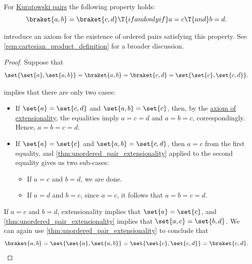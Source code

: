 \begin{proposition}\label{thm:kuratowski_pair_extensionality}
  For \hyperref[def:kuratowski_pair]{Kuratowski pairs} the following property holds:
  \begin{equation*}
    \braket{ a, b } = \braket{ c, d } \T{if and only if} a = c \T{and} b = d.
  \end{equation*}
\end{proposition}
\begin{comments}
  \item \Textcite[72]{Bourbaki2004TheoryOfSets} introduce an axiom for the existence of ordered pairs satisfying this property. See \cref{rem:cartesian_product_definition} for a broader discussion.
\end{comments}
\begin{proof}
  \SufficiencySubProof Suppose that
  \begin{equation*}
    \set{ \set{ a }, \set{ a, b } }
    =
    \braket{ a, b }
    =
    \braket{ c, d }
    =
    \set{ \set{ c }, \set{ c, d } }.
  \end{equation*}

   implies that there are only two cases:
  \begin{itemize}
    \item If \( \set{ a } = \set{ c, d } \) and \( \set{ a, b } = \set{ c } \), then, by the \hyperref[def:axiomatic_set_theory/extensionality]{axiom of extensionality}, the equalities imply \( a = c = d \) and \( a = b = c \), correspondingly. Hence, \( a = b = c = d \).

    \item If \( \set{ a } = \set{ c } \) and \( \set{ a, b } = \set{ c, d } \), then \( a = c \) from the first equality, and \cref{thm:unordered_pair_extensionality} applied to the second equality gives us two sub-cases:
    \begin{itemize}
      \item If \( a = c \) and \( b = d \), we are done.
      \item If \( a = d \) and \( b = c \), since \( a = c \), it follows that \( a = b = c = d \).
    \end{itemize}
  \end{itemize}

  \NecessitySubProof If \( a = c \) and \( b = d \), extensionality implies that \( \set{ a } = \set{ c } \), and \cref{thm:unordered_pair_extensionality} implies that \( \set{ a, c } = \set{ b, d } \). We can again use \cref{thm:unordered_pair_extensionality} to conclude that
  \begin{equation*}
    \braket{ a, b }
    =
    \set{ \set{ a }, \set{ a, b } }
    =
    \set{ \set{ c }, \set{ c, d } }
    =
    \braket{ c, d }.
  \end{equation*}
\end{proof}

